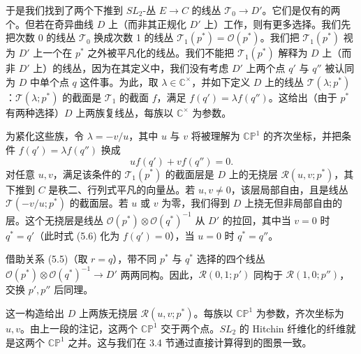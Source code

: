 \documentclass[11pt,a4paper]{article}
\begin{document}

于是我们找到了两个下推到 $SL_2$-丛 $E\to C$ 的线丛 $\mathcal{T}_0\to D'$。它们是仅有的两个。但若在奇异曲线 $D$ 上（而非其正规化 $D'$ 上）工作，则有更多选择。我们先把次数 0 的线丛 $\mathcal{T}_0$ 换成次数 1 的线丛 $\mathcal{T}_1(p^*) = \mathcal{O}(p^*)$。我们把 $\mathcal{T}_1(p^*)$ 视为 $D'$ 上一个在 $p^*$ 之外被平凡化的线丛。我们不能把 $\mathcal{T}_1(p^*)$ 解释为 $D$ 上（而非 $D'$ 上）的线丛，因为在其定义中，我们没有考虑 $D'$ 上两个点 $q'$ 与 $q''$ 被认同为 $D$ 中单个点 $q$ 这件事。为此，取 $\lambda\in\mathbb{C}^\times$，并如下定义 $D$ 上的线丛 $\mathcal{T}(\lambda;p^*)$：$\mathcal{T}(\lambda;p^*)$ 的截面是 $\mathcal{T}_1$ 的截面 $f$，满足 $f(q') = \lambda f(q'')$。这给出（由于 $p^*$ 有两种选择）$D$ 上两族复线丛，每族以 $\mathbb{C}^\times$ 为参数。

为紧化这些族，令 $\lambda = -v/u$，其中 $u$ 与 $v$ 将被理解为 $\mathbb{CP}^1$ 的齐次坐标，并把条件 $f(q')=\lambda f(q'')$ 换成
\begin{equation}\tag{5.6}
u f(q') + v f(q'') = 0.
\end{equation}
对任意 $u,v$，满足该条件的 $\mathcal{T}_1(p^*)$ 的截面层是 $D$ 上的无挠层 $\mathcal{R}(u,v;p^*)$，其下推到 $C$ 是秩二、行列式平凡的向量丛。若 $u,v\neq 0$，该层局部自由，且是线丛 $\mathcal{T}(-v/u;p^*)$ 的截面层。若 $u$ 或 $v$ 为零，我们得到 $D$ 上挠无但非局部自由的层。这个无挠层是线丛 $\mathcal{O}(p^*)\otimes\mathcal{O}(q^*)^{-1}$ 从 $D'$ 的拉回，其中当 $v=0$ 时 $q^*=q'$（此时式 (5.6) 化为 $f(q')=0$），当 $u=0$ 时 $q^*=q''$。

借助关系 (5.5)（取 $r=q$），带不同 $p^*$ 与 $q^*$ 选择的四个线丛 $\mathcal{O}(p^*)\otimes\mathcal{O}(q^*)^{-1}\to D'$ 两两同构。因此，$\mathcal{R}(0,1;p')$ 同构于 $\mathcal{R}(1,0;p'')$，交换 $p',p''$ 后同理。

这一构造给出 $D$ 上两族无挠层 $\mathcal{R}(u,v;p^*)$。每族以 $\mathbb{CP}^1$ 为参数，齐次坐标为 $u,v$。由上一段的注记，这两个 $\mathbb{CP}^1$ 交于两个点。$SL_2$ 的 Hitchin 纤维化的纤维就是这两个 $\mathbb{CP}^1$ 之并。这与我们在 3.4 节通过直接计算得到的图景一致。
\end{document}
